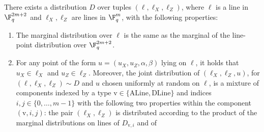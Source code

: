 \begin{lemma}
	\label{lem:qld-sublines}
	\notready
	There exists a distribution $D$
	over tuples $(\ell, \ell_X, \ell_Z)$, where $\ell$ is a line in
	$\F_q^{2m+2}$ and $\ell_X, \ell_Z$ are lines in $\F_q^m$, with the
	following properties:
	\begin{enumerate}
		\item The marginal distribution over $\ell$ is the same as the
		marginal of the line-point distribution over $\F_q^{2m+2}$.
		\item For any point of the form $u = (u_X, u_Z, \alpha, \beta)$
		lying on $\ell$, it holds that $u_X \in \ell_X$ and
		$u_Z \in \ell_Z$. Moreover, the joint distribution of
		$(\ell_X, \ell_Z, u)$, for $(\ell, \ell_X, \ell_Z) \sim D$ and
		$u$ chosen uniformly at random on $\ell$, is a mixture of
		components indexed by a type
		$\mathrm{v} \in \{\mathrm{ALine}, \mathrm{DLine}\}$ and indices
		$i, j \in \{0, \dots, m-1\}$ with the following two properties
		within the component $(\mathrm{v}, i, j)$: the pair
		$(\ell_X, \ell_Z)$ is distributed according to the product of the
		marginal distributions on lines of $D_{\mathrm{v},i}$ and of

\end{enumerate}
\end{lemma}
